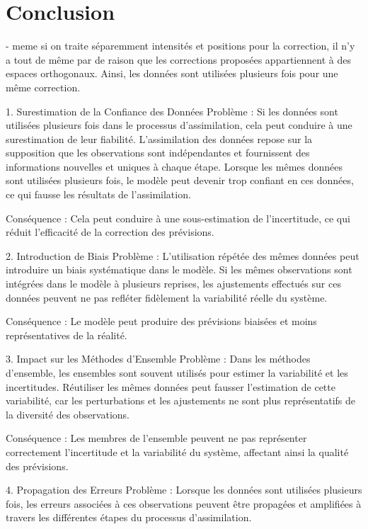 
\section{Conclusion}

- meme si on traite séparemment intensités et positions pour la correction, il n'y a tout de même par de raison que les corrections proposées appartiennent à des espaces orthogonaux. Ainsi, les données sont utilisées plusieurs fois pour une même correction.

1. Surestimation de la Confiance des Données
Problème : Si les données sont utilisées plusieurs fois dans le processus d'assimilation, cela peut conduire à une surestimation de leur fiabilité. L'assimilation des données repose sur la supposition que les observations sont indépendantes et fournissent des informations nouvelles et uniques à chaque étape. Lorsque les mêmes données sont utilisées plusieurs fois, le modèle peut devenir trop confiant en ces données, ce qui fausse les résultats de l'assimilation.

Conséquence : Cela peut conduire à une sous-estimation de l'incertitude, ce qui réduit l'efficacité de la correction des prévisions.

2. Introduction de Biais
Problème : L'utilisation répétée des mêmes données peut introduire un biais systématique dans le modèle. Si les mêmes observations sont intégrées dans le modèle à plusieurs reprises, les ajustements effectués sur ces données peuvent ne pas refléter fidèlement la variabilité réelle du système.

Conséquence : Le modèle peut produire des prévisions biaisées et moins représentatives de la réalité.

3. Impact sur les Méthodes d'Ensemble
Problème : Dans les méthodes d'ensemble, les ensembles sont souvent utilisés pour estimer la variabilité et les incertitudes. Réutiliser les mêmes données peut fausser l'estimation de cette variabilité, car les perturbations et les ajustements ne sont plus représentatifs de la diversité des observations.

Conséquence : Les membres de l'ensemble peuvent ne pas représenter correctement l'incertitude et la variabilité du système, affectant ainsi la qualité des prévisions.

4. Propagation des Erreurs
Problème : Lorsque les données sont utilisées plusieurs fois, les erreurs associées à ces observations peuvent être propagées et amplifiées à travers les différentes étapes du processus d'assimilation.

